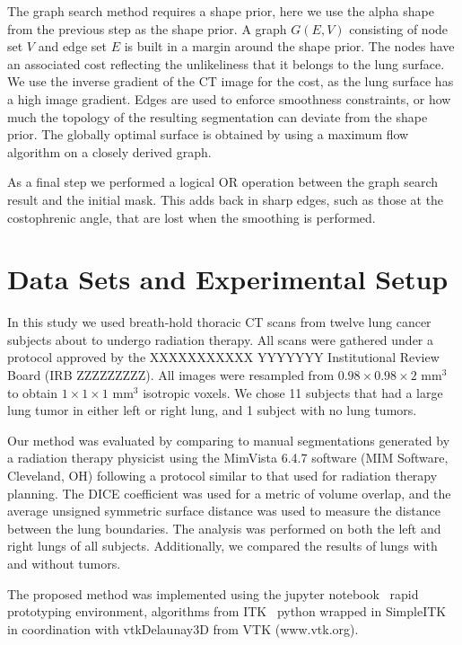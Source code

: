 \documentclass{llncs}
\begin{document}
The graph search method requires a shape prior, here we use the alpha shape from the previous step as the shape prior. A graph $G(E,V)$ consisting of node set $V$ and edge set $E$ is built in a margin around the shape prior. The nodes have an associated cost reflecting the unlikeliness that it belongs to the lung surface. We use the inverse gradient of the CT image for the cost, as the lung surface has a high image gradient. Edges are used to enforce smoothness constraints, or how much the topology of the resulting segmentation can deviate from the shape prior. The globally optimal surface is obtained by using a maximum flow algorithm on a closely derived graph. 

As a final step we performed a logical OR operation between the graph search result and the initial mask. This adds back in sharp edges, such as those at the costophrenic angle, that are lost when the smoothing is performed.
 

%
\section{Data Sets and Experimental Setup}
%
In this study we used breath-hold thoracic CT scans from twelve lung cancer subjects about to undergo radiation therapy. All scans were gathered under a protocol approved by the 
XXXXXXXXXXX YYYYYYY 
Institutional Review Board 
(IRB ZZZZZZZZZ).
All images were resampled from $0.98\times{}0.98\times{}2$ mm$^3$ to obtain $1\times{}1\times{}1$ mm$^3$ isotropic voxels. We chose 11 subjects that had a large lung tumor in either left or right lung, and 1 subject with no lung tumors.

Our method was evaluated by comparing to manual segmentations generated by a radiation therapy physicist using the MimVista 6.4.7 software (MIM Software, Cleveland, OH) following a protocol similar to that used for radiation therapy planning. The DICE coefficient was used for a metric of volume overlap, and the average unsigned symmetric surface distance was used to measure the distance between the lung boundaries. The analysis was performed on both the left and right lungs of all subjects. Additionally, we compared the results of lungs with and without tumors.


The proposed method was implemented using the jupyter notebook~\cite{PER-GRA:2007} rapid prototyping environment,  algorithms from ITK~\cite{johnson2015itk} python wrapped in SimpleITK~\cite{10.3389/fninf.2013.00045} in coordination with vtkDelaunay3D from VTK (www.vtk.org).
\end{document}
